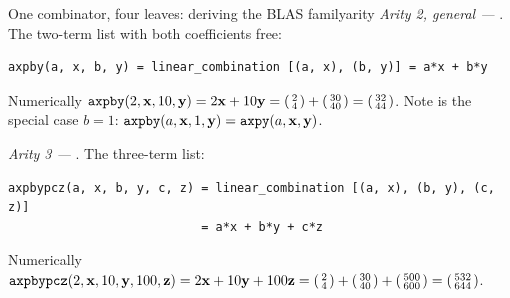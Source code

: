 \begin{workedexample}{One combinator, four leaves: deriving the BLAS family}{arity}
\emph{Arity 2, general ---} . The two-term list with both coefficients
free:
\begin{lstlisting}[style=l4style]
axpby(a, x, b, y) = linear_combination [(a, x), (b, y)] = a*x + b*y
\end{lstlisting}
Numerically $\texttt{axpby}(2, \mathbf{x}, 10, \mathbf{y}) = 2\mathbf{x} + 10\mathbf{y} =
\begin{psmallmatrix}2\\4\end{psmallmatrix} + \begin{psmallmatrix}30\\40\end{psmallmatrix}
= \begin{psmallmatrix}32\\44\end{psmallmatrix}$. Note  is the special
case $b = 1$: $\texttt{axpby}(a, \mathbf{x}, 1, \mathbf{y}) = \texttt{axpy}(a, \mathbf{x}, \mathbf{y})$.

\emph{Arity 3 ---} . The three-term list:
\begin{lstlisting}[style=l4style]
axpbypcz(a, x, b, y, c, z) = linear_combination [(a, x), (b, y), (c, z)]
                           = a*x + b*y + c*z
\end{lstlisting}
Numerically $\texttt{axpbypcz}(2,\mathbf{x},10,\mathbf{y},100,\mathbf{z}) = 2\mathbf{x} + 10\mathbf{y} + 100\mathbf{z} =
\begin{psmallmatrix}2\\4\end{psmallmatrix}+\begin{psmallmatrix}30\\40\end{psmallmatrix}
+\begin{psmallmatrix}500\\600\end{psmallmatrix}=\begin{psmallmatrix}532\\644\end{psmallmatrix}$.


\end{workedexample}
